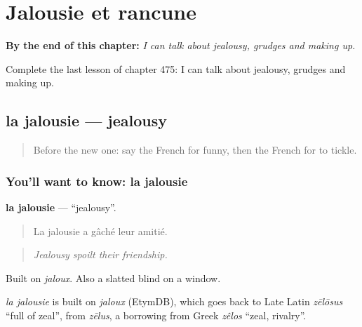 
\chapter{Jalousie et rancune}
\label{ch:fr-jalousie-et-rancune}

\begin{chapteropening}
\textbf{By the end of this chapter:} \emph{I can talk about jealousy, grudges and making up.}

Complete the last lesson of chapter 475: I can talk about jealousy, grudges and making up.
\end{chapteropening}

\section[la jalousie]{la jalousie — jealousy}

\label{lesson:FR-C475-jalousie}



\begin{quote}
Before the new one: say the French for funny, then the French for to tickle.
\end{quote}

\subsection*{You'll want to know: la jalousie}
\textbf{la jalousie} — \textquotedblleft{}jealousy\textquotedblright{}.

\begin{quote}
La jalousie a gâché leur amitié.
\end{quote}

\begin{quote}
\emph{Jealousy spoilt their friendship.}
\end{quote}

Built on \emph{jaloux}. Also a slatted blind on a window.

\begin{cousinweb}
\emph{la jalousie} is built on \emph{jaloux} (EtymDB), which goes back to Late Latin \emph{zēlōsus} \textquotedblleft{}full of zeal\textquotedblright{}, from \emph{zēlus}, a borrowing from Greek \emph{zêlos} \textquotedblleft{}zeal, rivalry\textquotedblright{}.
\end{cousinweb}

